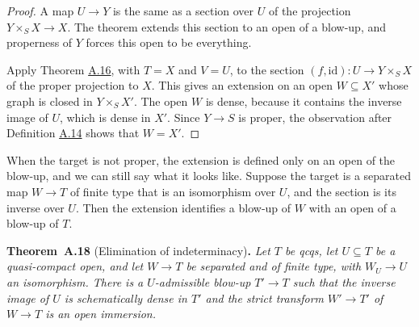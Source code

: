 \documentclass[11pt]{article}
\newenvironment{bpstatement}[2]{\par\addvspace{0.6\baselineskip}\noindent\textbf{#1}#2\textbf{.}\enspace\ignorespaces}
  {\par\addvspace{0.4\baselineskip}}
\newenvironment{bpstatementit}[2]{\begin{bpstatement}{#1}{#2}\itshape\ignorespaces}{\end{bpstatement}}
\begin{document}
\begin{proof}[{Proof}]\label{bp44}%
A map \(U\to Y\) is the same as a section over \(U\) of the projection \(Y\times_SX\to X\). The theorem extends this section to an open of a blow-up, and properness of \(Y\) forces this open to be everything.

Apply Theorem \hyperref[bp41]{A.16}, with \(T=X\) and \(V=U\), to the section \((f,\mathrm{id}):U\to Y\times_SX\) of the proper projection to \(X\). This gives an extension on an open \(W\subseteq X'\) whose graph is closed in \(Y\times_SX'\). The open \(W\) is dense, because it contains the inverse image of \(U\), which is dense in \(X'\). Since \(Y\to S\) is proper, the observation after Definition \hyperref[bp36]{A.14} shows that \(W=X'\).
\end{proof}

\label{bp45}%
When the target is not proper, the extension is defined only on an open of the blow-up, and we can still say what it looks like. Suppose the target is a separated map \(W\to T\) of finite type that is an isomorphism over \(U\), and the section is its inverse over \(U\). Then the extension identifies a blow-up of \(W\) with an open of a blow-up of \(T\).

\label{bp46}%
\begin{bpstatementit}{Theorem~A.18}{ (Elimination of indeterminacy)}
Let \(T\) be qcqs, let \(U\subseteq T\) be a quasi-compact open, and let \(W\to T\) be separated and of finite type, with \(W_U\to U\) an isomorphism. There is a \(U\)-admissible blow-up \(T'\to T\) such that the inverse image of \(U\) is schematically dense in \(T'\) and the strict transform \(W'\to T'\) of \(W\to T\) is an open immersion.
\end{bpstatementit}
\end{document}
